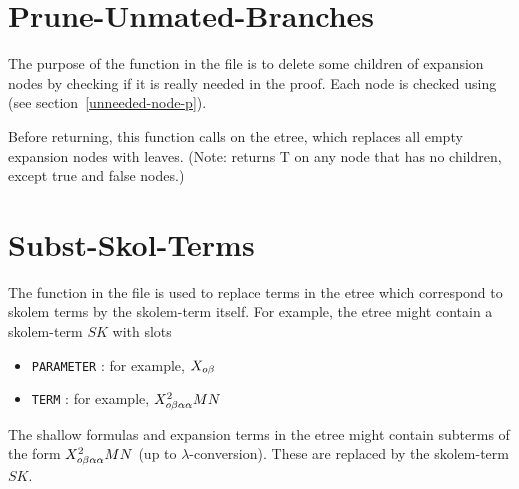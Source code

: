 % 

\section{Prune-Unmated-Branches}\label{prune-unmated-branches}

The purpose of the function 
in the file {\it{}} is to delete some children of expansion
nodes by checking
if it is really needed in the proof.  Each node is checked using 
(see section~\ref{unneeded-node-p}).

Before returning, this function calls  on the etree,
which replaces all empty expansion nodes with leaves.  (Note: 
returns T on any node that has no children, except true and false nodes.)

\section{Subst-Skol-Terms}\label{subst-skol-terms}

The function 
in the file {\it{}}
is used to replace terms in the etree which
correspond to skolem terms by the skolem-term itself.
For example, the etree might contain a skolem-term $SK$
with slots
\begin{itemize}
\item \verb+PARAMETER+ : for example, $X_{o\beta}$
\item \verb+TERM+ : for example, $X^2_{o\beta\alpha\alpha} M N$
\end{itemize}
The shallow formulas and expansion terms in the etree
might contain subterms of the form
$X^2_{o\beta\alpha\alpha} M N$
(up to $\lambda$-conversion).  These are replaced
by the skolem-term $SK$.

